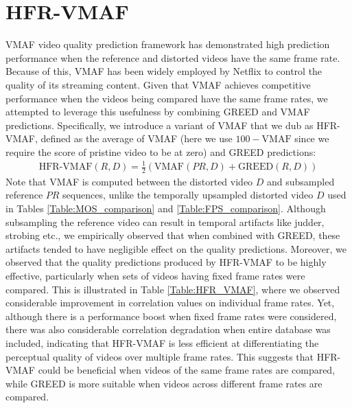 \documentclass[journal]{IEEEtran}
\begin{document}
\section{HFR-VMAF}
VMAF video quality prediction framework has demonstrated high prediction performance when the reference and distorted videos have the same frame rate. Because of this, VMAF has been widely employed by Netflix to control the quality of its streaming content. Given that VMAF achieves competitive performance when the videos being compared have the same frame rates, we attempted to leverage this usefulness by combining GREED and VMAF predictions. Specifically, we introduce a variant of VMAF that we dub as HFR-VMAF, defined as the average of VMAF (here we use $100 - \text{VMAF}$ since we require the score of pristine video to be at zero) and GREED predictions:
\begin{align}
\text{HFR-VMAF}(R,D) = \frac{1}{2}(\text{VMAF}(PR,D) + \text{GREED}(R,D))
    \label{eqn:HFR_VMAF}
\end{align}
Note that VMAF is computed between the distorted video $D$ and subsampled reference $PR$ sequences, unlike the temporally upsampled distorted video $D$ used in Tables \ref{Table:MOS_comparison} and \ref{Table:FPS_comparison}. Although subsampling the reference video can result in temporal artifacts like judder, strobing etc., we empirically observed that when combined with GREED, these artifacts tended to have negligible effect on the quality predictions. Moreover, we observed that the quality predictions produced by HFR-VMAF to be highly effective, particularly when sets of videos having fixed frame rates were compared. This is illustrated in Table \ref{Table:HFR_VMAF}, where we observed considerable improvement in correlation values on individual frame rates. Yet, although there is a performance boost when fixed frame rates were considered, there was also considerable correlation degradation when entire database was included, indicating that HFR-VMAF is less efficient at differentiating the perceptual quality of videos over multiple frame rates. This suggests that HFR-VMAF could be beneficial when videos of the same frame rates are compared, while GREED is more suitable when videos across different frame rates are compared. 
\end{document}
